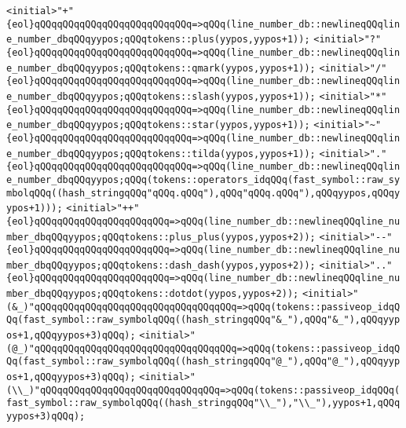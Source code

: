 \verb|<initial>"+"{eol}qQQqqQQqqQQqqQQqqQQqqQQqqQQq=>qQQq(line_number_db::newlineqQQqline_number_dbqQQqyypos;qQQqtokens::plus(yypos,yypos+1));|\newline
\verb|<initial>"?"{eol}qQQqqQQqqQQqqQQqqQQqqQQqqQQq=>qQQq(line_number_db::newlineqQQqline_number_dbqQQqyypos;qQQqtokens::qmark(yypos,yypos+1));|\newline
\verb|<initial>"/"{eol}qQQqqQQqqQQqqQQqqQQqqQQqqQQq=>qQQq(line_number_db::newlineqQQqline_number_dbqQQqyypos;qQQqtokens::slash(yypos,yypos+1));|\newline
\verb|<initial>"*"{eol}qQQqqQQqqQQqqQQqqQQqqQQqqQQq=>qQQq(line_number_db::newlineqQQqline_number_dbqQQqyypos;qQQqtokens::star(yypos,yypos+1));|\newline
\verb|<initial>"~"{eol}qQQqqQQqqQQqqQQqqQQqqQQqqQQq=>qQQq(line_number_db::newlineqQQqline_number_dbqQQqyypos;qQQqtokens::tilda(yypos,yypos+1));|\newline
\verb|<initial>"."{eol}qQQqqQQqqQQqqQQqqQQqqQQqqQQq=>qQQq(line_number_db::newlineqQQqline_number_dbqQQqyypos;qQQq(tokens::operators_idqQQq(fast_symbol::raw_symbolqQQq((hash_stringqQQq"qQQq.qQQq"),qQQq"qQQq.qQQq"),qQQqyypos,qQQqyypos+1)));|\newline
\verb|<initial>"++"{eol}qQQqqQQqqQQqqQQqqQQqqQQq=>qQQq(line_number_db::newlineqQQqline_number_dbqQQqyypos;qQQqtokens::plus_plus(yypos,yypos+2));|\newline
\verb|<initial>"--"{eol}qQQqqQQqqQQqqQQqqQQqqQQq=>qQQq(line_number_db::newlineqQQqline_number_dbqQQqyypos;qQQqtokens::dash_dash(yypos,yypos+2));|\newline
\verb|<initial>".."{eol}qQQqqQQqqQQqqQQqqQQqqQQq=>qQQq(line_number_db::newlineqQQqline_number_dbqQQqyypos;qQQqtokens::dotdot(yypos,yypos+2));|\newline
\verb|<initial>"(&_)"qQQqqQQqqQQqqQQqqQQqqQQqqQQqqQQqqQQq=>qQQq(tokens::passiveop_idqQQq(fast_symbol::raw_symbolqQQq((hash_stringqQQq"&_"),qQQq"&_"),qQQqyypos+1,qQQqyypos+3)qQQq);|\newline
\verb|<initial>"(@_)"qQQqqQQqqQQqqQQqqQQqqQQqqQQqqQQqqQQq=>qQQq(tokens::passiveop_idqQQq(fast_symbol::raw_symbolqQQq((hash_stringqQQq"@_"),qQQq"@_"),qQQqyypos+1,qQQqyypos+3)qQQq);|\newline
\verb|<initial>"(\\_)"qQQqqQQqqQQqqQQqqQQqqQQqqQQqqQQq=>qQQq(tokens::passiveop_idqQQq(fast_symbol::raw_symbolqQQq((hash_stringqQQq"\\_"),"\\_"),yypos+1,qQQqyypos+3)qQQq);|\newline
